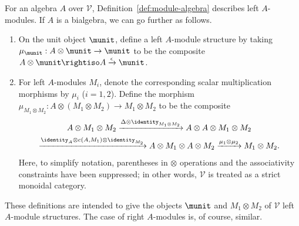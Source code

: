 For an algebra $A$ over $\mathcal{V}$,
Definition~\ref{def:module-algebra} describes left $A$-modules. If $A$ is a
bialgebra, we can go further as follows.
\begin{enumerate}
	\item On the unit object $\munit$, define a left $A$-module structure by
	taking $\mu_{\munit}:A\otimes\munit\to\munit$ to be the composite
	$A\otimes\munit\rightiso A\xrightarrow{\epsilon}\munit$.
	\item For left $A$-modules $M_i$, denote the corresponding scalar
	multiplication morphisms by $\mu_i$ ($i=1,2$). Define the morphism
	$\mu_{M_1\otimes M_2}:A\otimes(M_1\otimes M_2)\to M_1\otimes M_2$ to be
	the composite
	\begin{multline*}
		A \otimes M_1 \otimes M_2 \xrightarrow{\Delta \otimes \identity_{M_1 \otimes M_2}} A \otimes A \otimes M_1 \otimes M_2 \\
		\xrightarrow{\identity_A \otimes c(A, M_1) \otimes \identity_{M_2}} A \otimes M_1 \otimes A \otimes M_2 \xrightarrow{\mu_1 \otimes \mu_2} M_1 \otimes M_2.
	\end{multline*}
	Here, to simplify notation, parentheses in $\otimes$ operations and the
	associativity constraints have been suppressed; in other words,
	$\mathcal{V}$ is treated as a strict monoidal category.
\end{enumerate}

These definitions are intended to give the objects $\munit$ and
$M_1\otimes M_2$ of $\mathcal{V}$ left $A$-module structures. The case of
right $A$-modules is, of course, similar.

